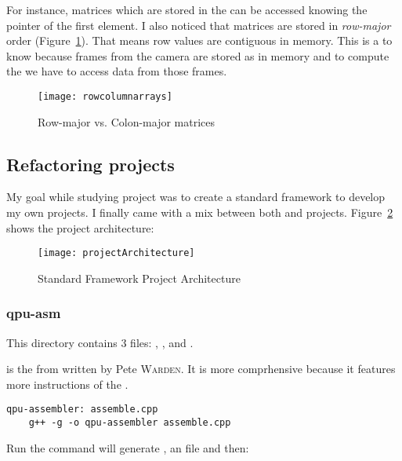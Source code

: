 For instance, matrices which are stored in the \ram{} can be accessed knowing the pointer of the first element. I also noticed that matrices are stored in \emph{row-major} order (Figure~\ref{rowcolumnarrays}). That means row values are contiguous in \ram{} memory. This is a  to know because frames from the \rasp{} camera are stored as  in memory and to compute the \flow{} we have to access data from those frames.

\begin{figure}[!htbp]
	\centering
	\texttt{[image: rowcolumnarrays]}
	\caption{Row-major vs. Colon-major matrices}
	\label{rowcolumnarrays}
\end{figure}
\FloatBarrier


\subsection{Refactoring projects}

My goal while studying  project was to create a standard framework to develop my own projects. I finally came with a mix between both  and  projects. Figure~\ref{projectArchitectureFigure} shows the project architecture:

\begin{figure}[!htbp]
	\centering
	\texttt{[image: projectArchitecture]}
	\caption{Standard Framework Project Architecture}
	\label{projectArchitectureFigure}
\end{figure}
\FloatBarrier


\subsubsection{qpu-asm}

This directory contains 3 files: , , and .

 is the  from  written by Pete \textsc{Warden}. It is more comprhensive because it features more instructions of the \vc.

\begin{lstlisting}
qpu-assembler: assemble.cpp
	g++ -g -o qpu-assembler assemble.cpp
\end{lstlisting}

Run the  command will generate , an  file and then:\\


